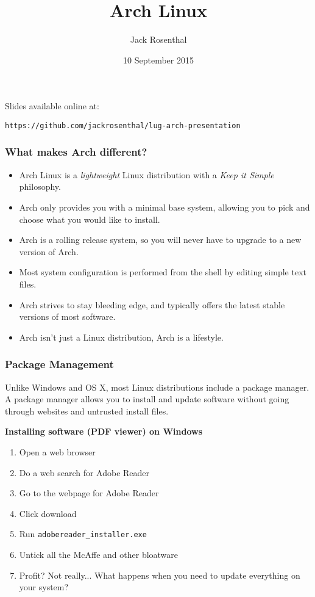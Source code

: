 \documentclass[mathserif]{beamer}
\title{Arch Linux}
\author{Jack Rosenthal}
\institute{CSM Linux Users Group}
\date{10 September 2015}
\begin{document}
\begin{frame}
\titlepage
Slides available online at:

\small
\tt https://github.com/jackrosenthal/lug-arch-presentation
\end{frame}

\begin{frame}
    \frametitle{What makes Arch different?}
    \pause
    \begin{itemize}[<+->]
        \item Arch Linux is a \emph{lightweight} Linux distribution with a
            \emph{Keep it Simple} philosophy.
        \item Arch only provides you with a minimal base system, allowing you
            to pick and choose what you would like to install.
        \item Arch is a rolling release system, so you will never have to
            upgrade to a new version of Arch.
        \item Most system configuration is performed from the shell by editing
            simple text files.
        \item Arch strives to stay bleeding edge, and typically offers the
            latest stable versions of most software.
        \item Arch isn't just a Linux distribution, Arch is a lifestyle.
    \end{itemize}
\end{frame}

\begin{frame}
    \frametitle{Package Management}
    Unlike Windows and OS X, most Linux distributions include a package
    manager. A package manager allows you to install and update software
    without going through websites and untrusted install files.

    \pause
    \textbf{Installing software (PDF viewer) on Windows}
    \begin{enumerate}
        \item Open a web browser \pause
        \item Do a web search for Adobe Reader \pause
        \item Go to the webpage for Adobe Reader \pause
        \item Click download \pause
        \item Run \texttt{adobereader\_installer.exe}  \pause
        \item Untick all the McAffe and other bloatware \pause
        \item Profit? \pause Not really... What happens when you need to update
            everything on your system?
    \end{enumerate}
\end{frame}
\end{document}
